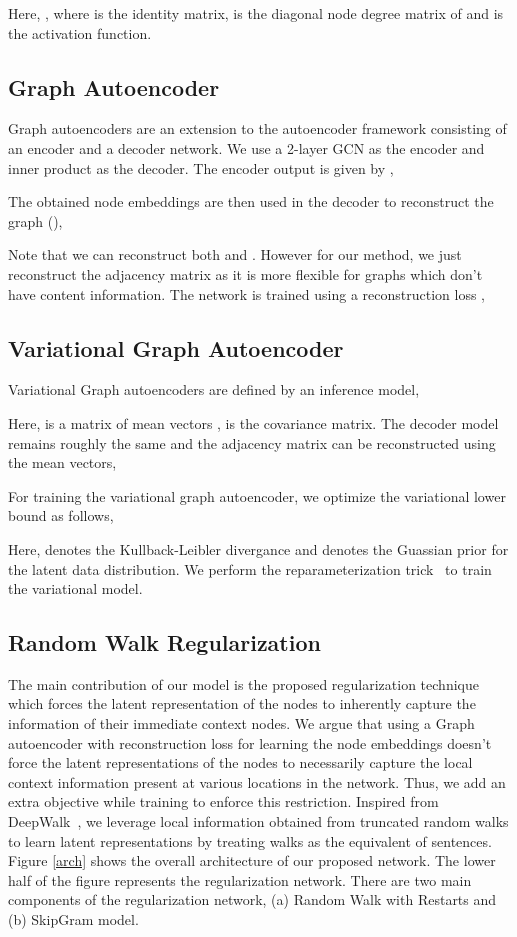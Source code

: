 \documentclass{article}
\begin{document}
Here,  , where  is the identity matrix,  is the diagonal node degree matrix of  and  is the activation function.

\subsection{Graph Autoencoder}
Graph autoencoders are an extension to the autoencoder framework consisting of an encoder and a decoder network. We use a 2-layer GCN as the encoder and inner product as the decoder. The encoder output is given by ,

The obtained node embeddings are then used in the decoder to reconstruct the graph (),

Note that we can reconstruct both  and . However for our method, we just reconstruct the adjacency matrix as it is more flexible for graphs which don't have content information.
The network is trained using a reconstruction loss ,

\subsection{Variational Graph Autoencoder}
Variational Graph autoencoders are defined by an inference model, 

Here,  is a matrix of mean vectors ,  is the covariance matrix. The decoder model remains roughly the same and the adjacency matrix can be reconstructed using the mean vectors, 

For training the variational graph autoencoder, we optimize the variational lower bound as follows, 

Here,  denotes the Kullback-Leibler divergance and  denotes the Guassian prior for the latent data distribution. We perform the reparameterization trick~\cite{kingma2013auto} to train the variational model.

\subsection{Random Walk Regularization}
The main contribution of our model is the proposed regularization technique which forces the latent representation of the nodes to inherently capture the information of their immediate context nodes. We argue that using a Graph autoencoder with reconstruction loss for learning the node embeddings doesn't force the latent representations of the nodes to necessarily capture the local context information present at various locations in the network. Thus, we add an extra objective while training to enforce this restriction. Inspired from DeepWalk~\cite{perozzi2014deepwalk}, we leverage local information obtained from truncated random walks to learn latent representations by treating walks as the equivalent of sentences. Figure \ref{arch} shows the overall architecture of our proposed network. The lower half of the figure represents the regularization network. There are two main components of the regularization network, (a) Random Walk with Restarts and (b) SkipGram model.
\end{document}
